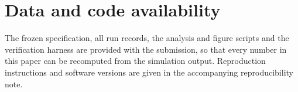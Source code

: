 
\section*{Data and code availability}

The frozen specification, all run records, the analysis and figure scripts and
the verification harness are provided with the submission, so that every number
in this paper can be recomputed from the simulation output. Reproduction
instructions and software versions are given in the accompanying
reproducibility note.





